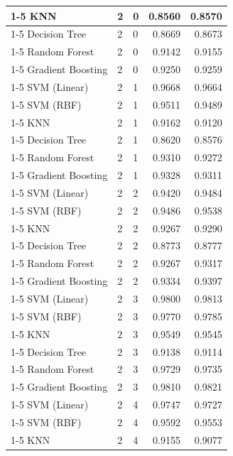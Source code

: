 \begin{table}
\begin{tabular}{lllrr}
\cline{1-5} \cline{2-5}
KNN & 2 & 0 & 0.8560 & 0.8570 \\
\cline{1-5} \cline{2-5}
Decision Tree & 2 & 0 & 0.8669 & 0.8673 \\
\cline{1-5} \cline{2-5}
Random Forest & 2 & 0 & 0.9142 & 0.9155 \\
\cline{1-5} \cline{2-5}
Gradient Boosting & 2 & 0 & 0.9250 & 0.9259 \\
\cline{1-5} \cline{2-5}
SVM (Linear) & 2 & 1 & 0.9668 & 0.9664 \\
\cline{1-5} \cline{2-5}
SVM (RBF) & 2 & 1 & 0.9511 & 0.9489 \\
\cline{1-5} \cline{2-5}
KNN & 2 & 1 & 0.9162 & 0.9120 \\
\cline{1-5} \cline{2-5}
Decision Tree & 2 & 1 & 0.8620 & 0.8576 \\
\cline{1-5} \cline{2-5}
Random Forest & 2 & 1 & 0.9310 & 0.9272 \\
\cline{1-5} \cline{2-5}
Gradient Boosting & 2 & 1 & 0.9328 & 0.9311 \\
\cline{1-5} \cline{2-5}
SVM (Linear) & 2 & 2 & 0.9420 & 0.9484 \\
\cline{1-5} \cline{2-5}
SVM (RBF) & 2 & 2 & 0.9486 & 0.9538 \\
\cline{1-5} \cline{2-5}
KNN & 2 & 2 & 0.9267 & 0.9290 \\
\cline{1-5} \cline{2-5}
Decision Tree & 2 & 2 & 0.8773 & 0.8777 \\
\cline{1-5} \cline{2-5}
Random Forest & 2 & 2 & 0.9267 & 0.9317 \\
\cline{1-5} \cline{2-5}
Gradient Boosting & 2 & 2 & 0.9334 & 0.9397 \\
\cline{1-5} \cline{2-5}
SVM (Linear) & 2 & 3 & 0.9800 & 0.9813 \\
\cline{1-5} \cline{2-5}
SVM (RBF) & 2 & 3 & 0.9770 & 0.9785 \\
\cline{1-5} \cline{2-5}
KNN & 2 & 3 & 0.9549 & 0.9545 \\
\cline{1-5} \cline{2-5}
Decision Tree & 2 & 3 & 0.9138 & 0.9114 \\
\cline{1-5} \cline{2-5}
Random Forest & 2 & 3 & 0.9729 & 0.9735 \\
\cline{1-5} \cline{2-5}
Gradient Boosting & 2 & 3 & 0.9810 & 0.9821 \\
\cline{1-5} \cline{2-5}
SVM (Linear) & 2 & 4 & 0.9747 & 0.9727 \\
\cline{1-5} \cline{2-5}
SVM (RBF) & 2 & 4 & 0.9592 & 0.9553 \\
\cline{1-5} \cline{2-5}
KNN & 2 & 4 & 0.9155 & 0.9077 \\

\end{tabular}
\end{table}
